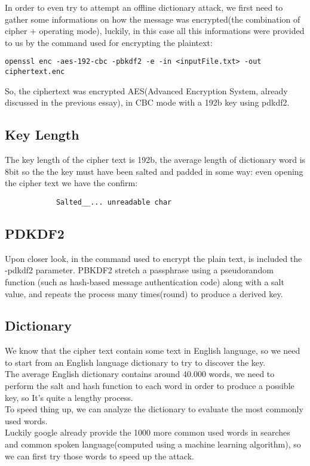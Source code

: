 \documentclass{article}
\begin{document}
In order to even try to attempt an offline dictionary attack, we first need to gather some informations on how the message was encrypted(the combination of cipher + operating mode), luckily, in this case all this informations were provided to us by the command used for encrypting the plaintext:
\begin{center}
\verb|openssl enc -aes-192-cbc -pbkdf2 -e -in <inputFile.txt> -out ciphertext.enc |
\end{center}

So, the ciphertext was encrypted AES(Advanced Encryption System, already discussed in the previous essay), in CBC mode with a 192b key using pdkdf2.\\

\subsection{Key Length}
The key length of the cipher text is 192b, the average length of dictionary word is 8bit so the the key must have been salted and padded in some way: even opening the cipher text we have the confirm:
		\begin{verbatim}
			Salted__... unreadable char		
		\end{verbatim}
		
\subsection{PDKDF2}
Upon closer look, in the command used to encrypt the plain text, is included the -pdkdf2 parameter.
PBKDF2 stretch a passphrase using a pseudorandom function (such as hash-based message authentication code) along with a salt value, and repeats the process many times(round) to produce a derived key.

\subsection{Dictionary}
We know that the cipher text contain some text in English language, so we need to start from an English language dictionary to try to discover the key.\\
The average English dictionary contains around 40.000 words, we need to perform the salt and hash function to each word in order to produce a possible key, so It's quite a lengthy process.\\
To speed thing up, we can analyze the dictionary to evaluate the most commonly used words.\\Luckily google already provide the 1000 more common used words in searches and common spoken language(computed using a machine learning algorithm), so we can first try those words to speed up the attack.
\end{document}
